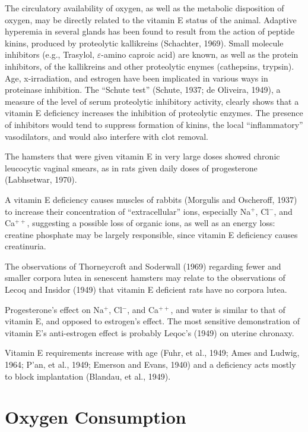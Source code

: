 The circulatory availability of oxygen, as well as the metabolic disposition of oxygen, may be directly related to the vitamin E status of the animal. Adaptive hyperemia in several glands has been found to result from the action of peptide kinins, produced by proteolytic kallikreins (Schachter, 1969). Small molecule inhibitors (e.g., Trasylol, $\varepsilon$-amino caproic acid) are known, as well as the protein inhibitors, of the kallikreins and other proteolytic enymes (cathepsins, trypsin). Age, x-irradiation, and estrogen have been implicated in various ways in proteinase inhibition. The ``Schute test'' (Schute, 1937; de Oliveira, 1949), a measure of the level of serum proteolytic inhibitory activity, clearly shows that a vitamin E deficiency increases the inhibition of proteolytic enzymes. The presence of inhibitors would tend to suppress formation of kinins, the local ``inflammatory'' vasodilators, and would also interfere with clot removal.

The hamsters that were given vitamin E in very large doses showed chronic leucocytic vaginal smears, as in rats given daily doses of progesterone (Labhsetwar, 1970).

A vitamin E deficiency causes muscles of rabbits (Morgulis and Oscheroff, 1937) to increase their concentration of ``extracellular'' ions, especially Na$^{+}$, Cl$^{-}$, and Ca$^{++}$, suggesting a possible loss of organic ions, as well as an energy loss: creatine phosphate may be largely responsible, since vitamin E deficiency causes creatinuria.

The observations of Thorneycroft and Soderwall (1969) regarding fewer and smaller corpora lutea in senescent hamsters may relate to the observations of Lecoq and Insidor (1949) that vitamin E deficient rats have no corpora lutea.

Progesterone's effect on Na$^{+}$, Cl$^{-}$, and Ca$^{++}$, and water is similar to that of vitamin E, and opposed to estrogen's effect. The most sensitive demonstration of vitamin E's anti-estrogen effect is probably Leqoc's (1949) on uterine chronaxy.

Vitamin E requirements increase with age (Fuhr, et al., 1949; Ames and Ludwig, 1964; P'an, et al., 1949; Emerson and Evans, 1940) and a deficiency acts mostly to block implantation (Blandau, et al., 1949).

\section{Oxygen Consumption}

